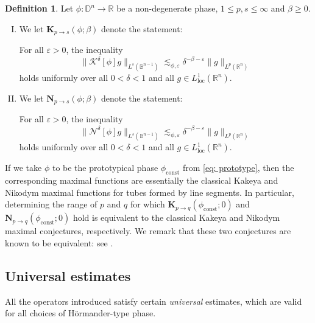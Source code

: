 \documentclass[reqno]{amsart}
\numberwithin{equation}{section}
\newcommand{\B}{\mathbb{B}}
\newcommand{\D}{\mathbb{D}}
\newcommand{\R}{\mathbb{R}}
\newcommand{\cK}{\mathcal{K}}
\newcommand{\cN}{\mathcal{N}}
\newcommand{\bK}{\mathbf{K}}
\newcommand{\bN}{\mathbf{N}}
\theoremstyle{plain}
\theoremstyle{definition}
\newtheorem{definition}[theorem]{Definition}
\begin{document}
\begin{definition}\label{defKN} Let $\phi \colon \D^n \to \R$ be a non-degenerate phase, $1 \leq p, s \leq \infty$ and $\beta \geq 0$. 
\begin{enumerate}[I)]
    \item We let $\bK_{p \to s}(\phi; \beta)$ denote the statement:\medskip
    
    \noindent For all $\varepsilon > 0$, the inequality
    \begin{equation*}
        \|\cK^{\delta}[\phi]g\|_{L^s(\B^{n-1})} \lesssim_{\phi, \varepsilon} \delta^{-\beta - \varepsilon}\|g\|_{L^p(\R^n)}
    \end{equation*}
    holds uniformly over all $0 < \delta < 1$ and all $g \in L^1_{\mathrm{loc}}(\R^n)$.  
    \item We let $\bN_{p \to s}(\phi;\beta)$ denote the statement:\medskip
    
    \noindent For all $\varepsilon > 0$, the inequality
    \begin{equation*}
        \|\cN^{\delta}[\phi]g\|_{L^s(\B^{n-1})} \lesssim_{\phi, \varepsilon} \delta^{-\beta - \varepsilon}\|g\|_{L^p(\R^n)}
    \end{equation*}
     holds uniformly over all $0 < \delta < 1$ and all $g \in L^1_{\mathrm{loc}}(\R^n)$. 
\end{enumerate} 
\end{definition}

If we take $\phi$ to be the prototypical phase $\phi_{\mathrm{const}}$ from \eqref{eq: prototype}, then the corresponding maximal functions are essentially the classical Kakeya and Nikodym maximal functions for tubes formed by line segments. In particular, determining the range of $p$ and $q$ for which $\bK_{p \to q}(\phi_{\mathrm{const}};0)$ and $\bN_{p \to q}(\phi_{\mathrm{const}};0)$ hold is equivalent to the classical Kakeya and Nikodym maximal conjectures, respectively. We remark that these two conjectures are known to be equivalent: see \cite{Tao1999}. 







\subsection{Universal estimates} All the operators introduced satisfy certain \textit{universal} estimates, which are valid for all choices of H\"ormander-type phase. 
\end{document}
